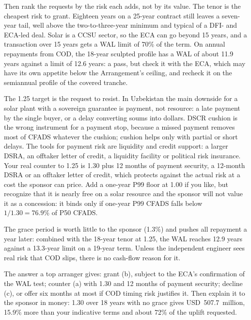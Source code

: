 Then rank the requests by the risk each adds, not by its value. The tenor is the cheapest risk to grant. Eighteen years on a 25-year contract still leaves a seven-year tail, well above the two-to-three-year minimum and typical of a DFI- and ECA-led deal. Solar is a CCSU sector, so the ECA can go beyond 15 years, and a transaction over 15 years gets a WAL limit of 70\% of the term. On annual repayments from COD, the 18-year sculpted profile has a WAL of about 11.9 years against a limit of 12.6 years: a pass, but check it with the ECA, which may have its own appetite below the Arrangement's ceiling, and recheck it on the semiannual profile of the covered tranche.

The 1.25\x{} target is the request to resist. In Uzbekistan the main downside for a solar plant with a sovereign guarantee is payment, not resource: a late payment by the single buyer, or a delay converting soums into dollars. DSCR cushion is the wrong instrument for a payment stop, because a missed payment removes most of CFADS whatever the cushion; cushion helps only with partial or short delays. The tools for payment risk are liquidity and credit support: a larger DSRA, an offtaker letter of credit, a liquidity facility or political risk insurance. Your real counter to 1.25\x{} is 1.30\x{} plus 12 months of payment security, a 12-month DSRA or an offtaker letter of credit, which protects against the actual risk at a cost the sponsor can price. Add a one-year P99 floor at 1.00\x{} if you like, but recognize that it is nearly free on a solar resource and the sponsor will not value it as a concession: it binds only if one-year P99 CFADS falls below $1/1.30 = 76.9\%$ of P50 CFADS.

The grace period is worth little to the sponsor (1.3\%) and pushes all repayment a year later: combined with the 18-year tenor at 1.25\x, the WAL reaches 12.9 years against a 13.3-year limit on a 19-year term. Unless the independent engineer sees real risk that COD slips, there is no cash-flow reason for it.

The answer a top arranger gives: grant (b), subject to the ECA's confirmation of the WAL test; counter (a) with 1.30\x{} and 12 months of payment security; decline (c), or offer six months at most if COD timing risk justifies it. Then explain it to the sponsor in money: 1.30\x{} over 18 years with no grace gives USD~507.7~million, 15.9\% more than your indicative terms and about 72\% of the uplift requested.

